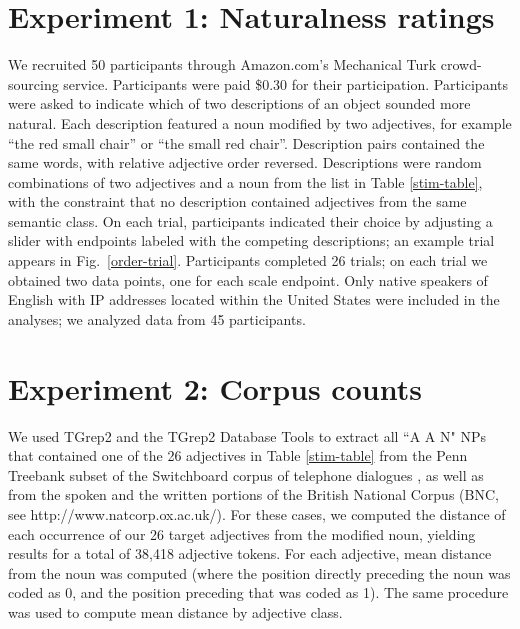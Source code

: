 \documentclass{pnastwo}
\newcommand{\tableref}[1]{Table \ref{#1}}
\newcommand{\figref}[1]{Fig.~\ref{#1}}
\begin{document}
\begin{article}
\begin{materials}
\section{Experiment 1: Naturalness ratings}	
We recruited 50 participants through Amazon.com's Mechanical Turk crowd-sourcing service. Participants were paid \$0.30 for their participation.
Participants were asked to indicate which of two descriptions of an object sounded more natural. Each description featured a noun modified by two adjectives, for example ``the red small chair'' or ``the small red chair''. Description pairs contained the same words, with relative adjective order reversed. Descriptions were random combinations of two adjectives and a noun from the list in Table \ref{stim-table}, with the constraint that no description contained adjectives from the same semantic class.
On each trial, participants indicated their choice by adjusting a slider with endpoints labeled with the competing descriptions; an example trial appears in Fig.\ \ref{order-trial}. Participants completed 26 trials; on each trial we obtained two data points, one for each scale endpoint.  Only native speakers of English with IP addresses located within the United States were included in the analyses; we analyzed data from 45 participants.

\section{Experiment 2: Corpus counts} 
We used TGrep2 \cite{rohde2005} and the TGrep2 Database Tools \cite{degenjaeger-tdt} to extract all ``A A N"  NPs that contained one of the 26 adjectives in Table \ref{stim-table} from the Penn Treebank subset of the Switchboard corpus of telephone dialogues \cite{godfrey1992}, as well as from the spoken and the written portions of the British National Corpus (BNC, see http://www.natcorp.ox.ac.uk/). For these cases, we computed the distance of each occurrence of our 26 target adjectives from the modified noun, yielding results for a total of 38,418 adjective tokens.  For each adjective, mean distance from the noun was computed (where the position directly preceding the noun was coded as 0, and the position preceding that was coded as 1). The same procedure was used to compute mean distance by adjective class.


\end{materials}
\end{article}
\end{document}
